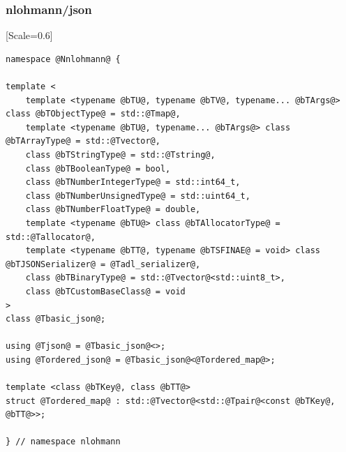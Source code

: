 \begin{frame}[fragile]
\frametitle{\texorpdfstring{\ttfamily nlohmann/json}{nlohmann/json}}
\begin{minipage}{\textwidth}
\renewcommand{\baselinestretch}{0.7}
\setmonofont{DejaVu Sans Mono}[Scale=0.6]
\begin{lstlisting}
namespace @Nnlohmann@ {

template <
    template <typename @bTU@, typename @bTV@, typename... @bTArgs@> class @bTObjectType@ = std::@Tmap@,
    template <typename @bTU@, typename... @bTArgs@> class @bTArrayType@ = std::@Tvector@,
    class @bTStringType@ = std::@Tstring@,
    class @bTBooleanType@ = bool,
    class @bTNumberIntegerType@ = std::int64_t,
    class @bTNumberUnsignedType@ = std::uint64_t,
    class @bTNumberFloatType@ = double,
    template <typename @bTU@> class @bTAllocatorType@ = std::@Tallocator@,
    template <typename @bTT@, typename @bTSFINAE@ = void> class @bTJSONSerializer@ = @Tadl_serializer@,
    class @bTBinaryType@ = std::@Tvector@<std::uint8_t>,
    class @bTCustomBaseClass@ = void
>
class @Tbasic_json@;

using @Tjson@ = @Tbasic_json@<>;
using @Tordered_json@ = @Tbasic_json@<@Tordered_map@>;

template <class @bTKey@, class @bTT@>
struct @Tordered_map@ : std::@Tvector@<std::@Tpair@<const @bTKey@, @bTT@>>;

} // namespace nlohmann
\end{lstlisting}
\end{minipage}
\end{frame}

